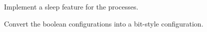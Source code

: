
\begin{DoxyRefList}
\item[Global \mbox{\hyperlink{k__handlers_8c_a2d7e1a901a06a5e232261de821380ee8}{System\+Tick\+\_\+handler}} (void)]\label{todo__todo000002}%
%
Implement a sleep feature for the processes.  
\item[Global \mbox{\hyperlink{uart_8h_ad35da456a0bfc73e5a9c6dfbfb420552}{U\+A\+R\+T0\+\_\+\+Init}} (uart\+\_\+descriptor\+\_\+t $\ast$descriptor)]\label{todo__todo000001}%
%
Convert the boolean configurations into a bit-\/style configuration. 
\end{DoxyRefList}